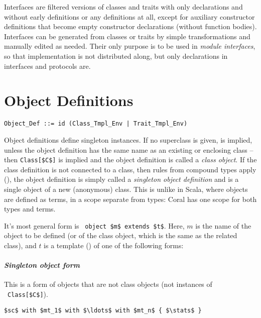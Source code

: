 Interfaces are filtered versions of classes and traits with only declarations and without early definitions or any definitions at all, except for auxiliary constructor definitions that become empty constructor declarations (without function bodies). Interfaces can be generated from classes or traits by simple transformations and manually edited as needed. Their only purpose is to be used in {\em module interfaces}, so that implementation is not distributed along, but only declarations in interfaces and protocols are. 






\section{Object Definitions}
\label{sec:object-definitions}

\syntax\begin{lstlisting}
Object_Def ::= id (Class_Tmpl_Env | Trait_Tmpl_Env)
\end{lstlisting}

Object definitions define singleton instances. If no superclass is given,  is implied, unless the object definition has the same name as an existing or enclosing class -- then \lstinline!Class[$C$]! is implied and the object definition is called a {\em class object}. If the class definition is not connected to a class, then rules from compound types apply (), the object definition is simply called a {\em singleton object definition} and is a single object of a new (anonymous) class. This is unlike in Scala, where objects are defined as terms, in a scope separate from types: Coral has one scope for both types and terms. 

It's most general form is ~\lstinline!object $m$ extends $t$!. Here, $m$ is the name of the object to be defined (or of the class object, which is the same as the related class), and $t$ is a template () of one of the following forms:

\paragraph{\em Singleton object form}
This is a form of objects that are not class objects (not instances of ~\lstinline!Class[$C$]!). 
\begin{lstlisting}
$sc$ with $mt_1$ with $\ldots$ with $mt_n$ { $\stats$ }
\end{lstlisting}

